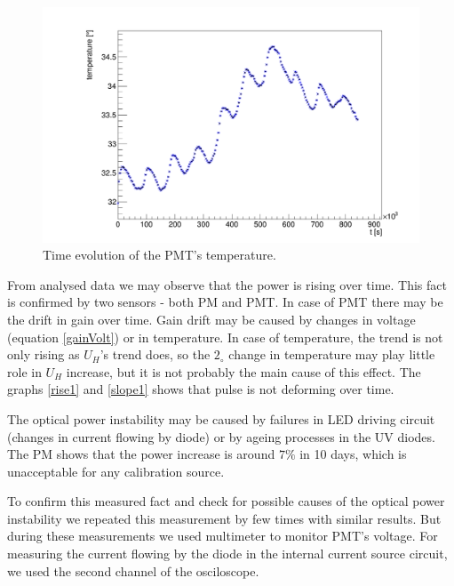 \begin{figure}[H]
 \centering
 \includegraphics[scale=0.3]{./pictures/temperatures}
 \caption{Time evolution of the PMT's temperature.}
 \label{temp1}
\end{figure}

From analysed data we may observe that the power is rising over time. This fact is confirmed by two sensors - both PM and PMT. In case of PMT there may be the drift in gain over time. Gain drift may be caused by changes in voltage (equation \ref{gainVolt}) or in temperature. In case of temperature, the trend is not only rising as $U_{H}$'s trend does, so the $2_{\circ}$ change in temperature may play little role in $U_{H}$ increase, but it is not probably the main cause of this effect.
The graphs \ref{rise1} and \ref{slope1} shows that pulse is not deforming over time.
\par
The optical power instability may be caused by failures in LED driving circuit (changes in current flowing by diode) or by ageing processes in the UV diodes. The PM shows that the power increase is around $7 \%$ in 10 days, which is unacceptable for any calibration source. 
\par
To confirm this measured fact and check for possible causes of the optical power instability we repeated this measurement by few times with similar results. But during these measurements we used multimeter to monitor PMT's voltage. For measuring the current flowing by the diode in the internal current source circuit, we used the second channel of the osciloscope.

